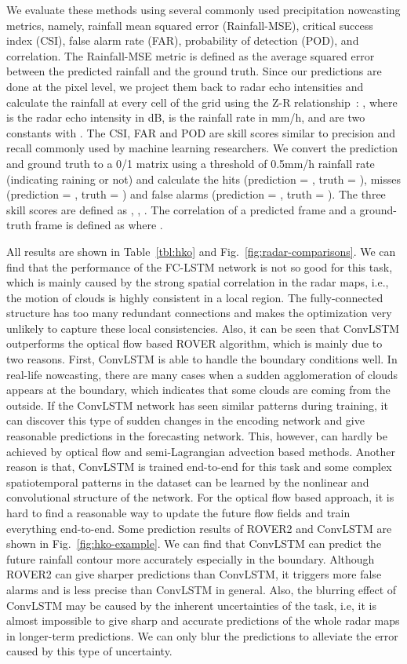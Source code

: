 \documentclass{article} \usepackage{amsmath}
\begin{document}
We evaluate these methods using several commonly used precipitation nowcasting metrics, namely, rainfall mean squared error (Rainfall-MSE), critical success index (CSI), false alarm rate (FAR), probability of detection (POD), and correlation. The Rainfall-MSE metric is defined as the average squared error between the predicted rainfall and the ground truth. Since our predictions are done at the pixel level, we project them back to radar echo intensities and calculate the rainfall at every cell of the grid using the Z-R relationship~\cite{li2000swirls}:
,
where  is the radar echo intensity in dB,  is the rainfall rate in mm/h, and  are two constants with . The CSI, FAR and POD are skill scores similar to precision and recall commonly used by machine learning researchers. We convert the prediction and ground truth to a 0/1 matrix using a threshold of 0.5mm/h rainfall rate (indicating raining or not) and calculate the hits (prediction = , truth = ), misses (prediction = , truth = ) and false alarms (prediction = , truth = ). The three skill scores are defined as , , . The correlation of a predicted frame  and a ground-truth frame  is defined as  where .

All results are shown in Table~\ref{tbl:hko} and Fig.~\ref{fig:radar-comparisons}. We can find that the performance of the FC-LSTM network is not so good for this task, which is mainly caused by the strong spatial correlation in the radar maps, i.e., the motion of clouds is highly consistent in a local region. The fully-connected structure has too many redundant connections and makes the optimization very unlikely to capture these local consistencies. Also, it can be seen that ConvLSTM outperforms the optical flow based ROVER algorithm, which is mainly due to two reasons. First, ConvLSTM is able to handle the boundary conditions well. In real-life nowcasting, there are many cases when a sudden agglomeration of clouds appears at the boundary, which indicates that some clouds are coming from the outside. If the ConvLSTM network has seen similar patterns during training, it can discover this type of sudden changes in the encoding network and give reasonable predictions in the forecasting network.  This, however, can hardly be achieved by optical flow and semi-Lagrangian advection based methods. Another reason is that, ConvLSTM is trained end-to-end for this task and some complex spatiotemporal patterns in the dataset can be learned by the nonlinear and convolutional structure of the network. For the optical flow based approach, it is hard to find a reasonable way to update the future flow fields and train everything end-to-end. Some prediction results of ROVER2 and ConvLSTM are shown in Fig.~\ref{fig:hko-example}. We can find that ConvLSTM can predict the future rainfall contour more accurately especially in the boundary. Although ROVER2 can give sharper predictions than ConvLSTM, it triggers more false alarms and is less precise than ConvLSTM in general. Also, the blurring effect of ConvLSTM may be caused by the inherent uncertainties of the task, i.e, it is almost impossible to give sharp and accurate predictions of the whole radar maps in longer-term predictions. We can only blur the predictions to alleviate the error caused by this type of uncertainty.
\end{document}
